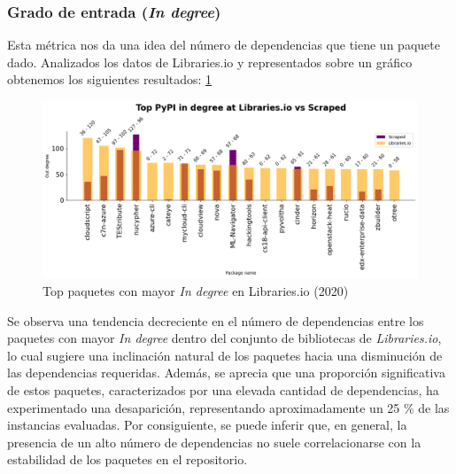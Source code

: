\subsubsection{Grado de entrada (\textit{In degree})}

Esta métrica nos da una idea del número de dependencias que tiene un paquete dado.
Analizados los datos de Libraries.io y representados sobre un gráfico obtenemos los siguientes resultados: \ref{fig:pypi_libio_ind_comparison}

\begin{figure}[ht!]
    \begin{center}
        \includegraphics[width=1\textwidth]{img/pypi/libio_t20_ind_comparison.png}
        \caption{Top paquetes con mayor \textit{In degree} en Libraries.io (2020)}
        \label{fig:pypi_libio_ind_comparison}
    \end{center}
\end{figure}

Se observa una tendencia decreciente en el número de dependencias entre los paquetes con mayor \textit{In degree}
dentro del conjunto de bibliotecas de \textit{Libraries.io}, lo cual sugiere una inclinación natural de los
paquetes hacia una disminución de las dependencias requeridas. Además, se aprecia que una proporción significativa
de estos paquetes, caracterizados por una elevada cantidad de dependencias, ha experimentado una desaparición,
representando aproximadamente un 25 \% de las instancias evaluadas. Por consiguiente, se puede inferir que,
en general, la presencia de un alto número de dependencias no suele correlacionarse con la estabilidad de
los paquetes en el repositorio.

